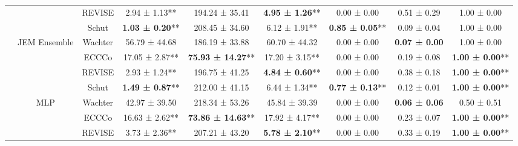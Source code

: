 \begin{table}
{\begin{tabular}[t]{ccccccccc}
 &  & REVISE & 2.94 ± 1.13** & 194.24 ± 35.41\hphantom{*}\hphantom{*} & \textbf{4.95 ± 1.26}** & 0.00 ± 0.00\hphantom{*}\hphantom{*} & 0.51 ± 0.29\hphantom{*}\hphantom{*} & 1.00 ± 0.00\hphantom{*}\hphantom{*}\\

 &  & Schut & \textbf{1.03 ± 0.20}** & 208.45 ± 34.60\hphantom{*}\hphantom{*} & 6.12 ± 1.91** & \textbf{0.85 ± 0.05}** & 0.09 ± 0.04\hphantom{*}\hphantom{*} & 1.00 ± 0.00\hphantom{*}\hphantom{*}\\

 & \multirow[t]{-4}{*}{\centering\arraybackslash JEM Ensemble} & Wachter & 56.79 ± 44.68\hphantom{*}\hphantom{*} & 186.19 ± 33.88\hphantom{*}\hphantom{*} & 60.70 ± 44.32\hphantom{*}\hphantom{*} & 0.00 ± 0.00\hphantom{*}\hphantom{*} & \textbf{0.07 ± 0.00}\hphantom{*}\hphantom{*} & 1.00 ± 0.00\hphantom{*}\hphantom{*}\\
\cmidrule{2-9}
 &  & ECCCo & 17.05 ± 2.87** & \textbf{75.93 ± 14.27}** & 17.20 ± 3.15** & 0.00 ± 0.00\hphantom{*}\hphantom{*} & 0.19 ± 0.08\hphantom{*}\hphantom{*} & \textbf{1.00 ± 0.00}**\\

 &  & REVISE & 2.93 ± 1.24** & 196.75 ± 41.25\hphantom{*}\hphantom{*} & \textbf{4.84 ± 0.60}** & 0.00 ± 0.00\hphantom{*}\hphantom{*} & 0.38 ± 0.18\hphantom{*}\hphantom{*} & \textbf{1.00 ± 0.00}**\\

 &  & Schut & \textbf{1.49 ± 0.87}** & 212.00 ± 41.15\hphantom{*}\hphantom{*} & 6.44 ± 1.34** & \textbf{0.77 ± 0.13}** & 0.12 ± 0.01\hphantom{*}\hphantom{*} & \textbf{1.00 ± 0.00}**\\

 & \multirow[t]{-4}{*}{\centering\arraybackslash MLP} & Wachter & 42.97 ± 39.50\hphantom{*}\hphantom{*} & 218.34 ± 53.26\hphantom{*}\hphantom{*} & 45.84 ± 39.39\hphantom{*}\hphantom{*} & 0.00 ± 0.00\hphantom{*}\hphantom{*} & \textbf{0.06 ± 0.06}\hphantom{*}\hphantom{*} & 0.50 ± 0.51\hphantom{*}\hphantom{*}\\
\cmidrule{2-9}
 &  & ECCCo & 16.63 ± 2.62** & \textbf{73.86 ± 14.63}** & 17.92 ± 4.17** & 0.00 ± 0.00\hphantom{*}\hphantom{*} & 0.23 ± 0.07\hphantom{*}\hphantom{*} & \textbf{1.00 ± 0.00}**\\

 &  & REVISE & 3.73 ± 2.36** & 207.21 ± 43.20\hphantom{*}\hphantom{*} & \textbf{5.78 ± 2.10}** & 0.00 ± 0.00\hphantom{*}\hphantom{*} & 0.33 ± 0.19\hphantom{*}\hphantom{*} & \textbf{1.00 ± 0.00}**\\


\end{tabular}}
\end{table}
